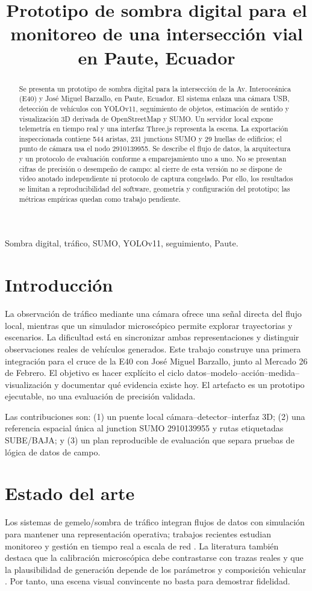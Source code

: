 \documentclass[conference]{IEEEtran}
\title{Prototipo de sombra digital para el monitoreo de una intersección vial en Paute, Ecuador}
\author{\IEEEauthorblockN{David Timbi y equipo}\IEEEauthorblockA{Proyecto académico, Paute, Ecuador}}
\begin{document}
\maketitle
\begin{abstract}
Se presenta un prototipo de sombra digital para la intersección de la Av. Interoceánica (E40) y José Miguel Barzallo, en Paute, Ecuador. El sistema enlaza una cámara USB, detección de vehículos con YOLOv11, seguimiento de objetos, estimación de sentido y visualización 3D derivada de OpenStreetMap y SUMO. Un servidor local expone telemetría en tiempo real y una interfaz Three.js representa la escena. La exportación inspeccionada contiene 544 aristas, 231 junctions SUMO y 29 huellas de edificios; el punto de cámara usa el nodo 2910139955. Se describe el flujo de datos, la arquitectura y un protocolo de evaluación conforme a emparejamiento uno a uno. No se presentan cifras de precisión o desempeño de campo: al cierre de esta versión no se dispone de video anotado independiente ni protocolo de captura congelado. Por ello, los resultados se limitan a reproducibilidad del software, geometría y configuración del prototipo; las métricas empíricas quedan como trabajo pendiente.
\end{abstract}
\begin{IEEEkeywords}Sombra digital, tráfico, SUMO, YOLOv11, seguimiento, Paute.
\end{IEEEkeywords}
\section{Introducción}
La observación de tráfico mediante una cámara ofrece una señal directa del flujo local, mientras que un simulador microscópico permite explorar trayectorias y escenarios. La dificultad está en sincronizar ambas representaciones y distinguir observaciones reales de vehículos generados. Este trabajo construye una primera integración para el cruce de la E40 con José Miguel Barzallo, junto al Mercado 26 de Febrero. El objetivo es hacer explícito el ciclo datos--modelo--acción--medida--visualización y documentar qué evidencia existe hoy. El artefacto es un prototipo ejecutable, no una evaluación de precisión validada.

Las contribuciones son: (1) un puente local cámara--detector--interfaz 3D; (2) una referencia espacial única al junction SUMO 2910139955 y rutas etiquetadas SUBE/BAJA; y (3) un plan reproducible de evaluación que separa pruebas de lógica de datos de campo.
\section{Estado del arte}
Los sistemas de gemelo/sombra de tráfico integran flujos de datos con simulación para mantener una representación operativa; trabajos recientes estudian monitoreo y gestión en tiempo real a escala de red \cite{lu2025}. La literatura también destaca que la calibración microscópica debe contrastarse con trazas reales y que la plausibilidad de generación depende de los parámetros y composición vehicular \cite{calibration2021,ma2021,kusic2023}. Por tanto, una escena visual convincente no basta para demostrar fidelidad.
\end{document}
